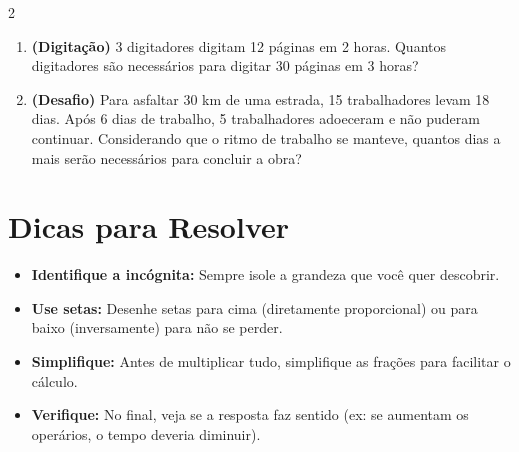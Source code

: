 \documentclass[11pt]{article}
\begin{document}
\begin{multicols}{2}
\begin{enumerate}[leftmargin=*]
\item \textbf{(Digitação)} 3 digitadores digitam 12 páginas em 2 horas. Quantos digitadores são necessários para digitar 30 páginas em 3 horas?

\item \textbf{(Desafio)} Para asfaltar 30 km de uma estrada, 15 trabalhadores levam 18 dias. Após 6 dias de trabalho, 5 trabalhadores adoeceram e não puderam continuar. Considerando que o ritmo de trabalho se manteve, quantos dias a mais serão necessários para concluir a obra?

\end{enumerate}

\section*{Dicas para Resolver}

\begin{itemize}
    \item \textbf{Identifique a incógnita:} Sempre isole a grandeza que você quer descobrir.
    \item \textbf{Use setas:} Desenhe setas para cima (diretamente proporcional) ou para baixo (inversamente) para não se perder.
    \item \textbf{Simplifique:} Antes de multiplicar tudo, simplifique as frações para facilitar o cálculo.
    \item \textbf{Verifique:} No final, veja se a resposta faz sentido (ex: se aumentam os operários, o tempo deveria diminuir).
\end{itemize}

\end{multicols}
\end{document}
